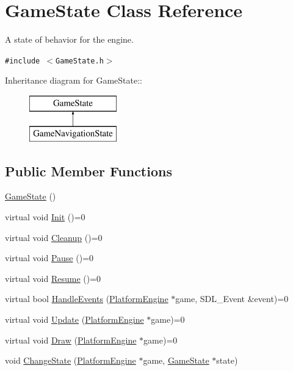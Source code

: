 \hypertarget{class_game_state}{
\section{GameState Class Reference}
\label{dd/d87/class_game_state}
}
A state of behavior for the engine.  


{\tt \#include $<$GameState.h$>$}

Inheritance diagram for GameState::\begin{figure}[H]
\begin{center}
\leavevmode
\includegraphics[height=2cm]{dd/d87/class_game_state}
\end{center}
\end{figure}
\subsection*{Public Member Functions}
\begin{CompactItemize}
\item 
\hyperlink{class_game_state_4fa0a2bf50315c4a35a3890a0adcee5c}{GameState} ()
\item 
virtual void \hyperlink{class_game_state_eec488593bae214c0f738bd64dafba32}{Init} ()=0
\item 
virtual void \hyperlink{class_game_state_041e7a5430d71da84745af11abdacd93}{Cleanup} ()=0
\item 
virtual void \hyperlink{class_game_state_1f4d2b5a2e4dcb7645e3e7a5735926a6}{Pause} ()=0
\item 
virtual void \hyperlink{class_game_state_cf9bcd5b47ebb3f572389f64c5ca5ed4}{Resume} ()=0
\item 
virtual bool \hyperlink{class_game_state_de7bd9bda91253614322ca0ea77b7a14}{HandleEvents} (\hyperlink{class_platform_engine}{PlatformEngine} $\ast$game, SDL\_\-Event \&event)=0
\item 
virtual void \hyperlink{class_game_state_100ca49bc95afce1d5c5b756708bbc2b}{Update} (\hyperlink{class_platform_engine}{PlatformEngine} $\ast$game)=0
\item 
virtual void \hyperlink{class_game_state_7333dda0f49b3fa1c01cd3295f853024}{Draw} (\hyperlink{class_platform_engine}{PlatformEngine} $\ast$game)=0
\item 
void \hyperlink{class_game_state_f786aeb704a22a135dc289bb89fcc452}{ChangeState} (\hyperlink{class_platform_engine}{PlatformEngine} $\ast$game, \hyperlink{class_game_state}{GameState} $\ast$state)
\end{CompactItemize}


